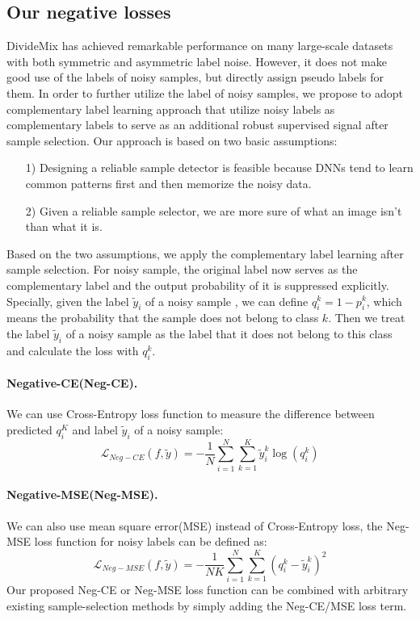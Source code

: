\documentclass[10pt,twocolumn,letterpaper]{article}
\begin{document}
\subsection{Our negative losses}
DivideMix has achieved remarkable performance on many large-scale datasets with both symmetric and asymmetric label noise. However, it does not make good use of the labels of noisy samples, but directly assign pseudo labels for them. In order to further utilize the label of noisy samples, we propose to adopt complementary label learning\cite{ishida2017learning} approach that utilize noisy labels as complementary labels to serve as an additional robust supervised signal after sample selection. Our approach is based on two basic assumptions:
\begin{itemize}
\item[1)] Designing a reliable sample detector is feasible because DNNs tend to learn common patterns first and then memorize the noisy data\cite{arpit2017closer}.
\item[2)] Given a reliable sample selector, we are more sure of what an image isn't than what it is.
\end{itemize}
Based on the two assumptions, we apply the complementary label learning after sample selection. For noisy sample, the original label now serves as the complementary label and the output probability of it is suppressed explicitly. Specially, given the label $ \tilde{y}_{i} $ of a noisy sample , we can define $ q_{i}^{k} = 1 - p_{i}^{k} $, which means the probability that the sample does not belong to class $ k $. Then we treat the label $ \tilde{y}_{i} $ of a noisy sample as the label that it does not belong to this class and calculate the loss with $q_{i}^{k}$.
\paragraph{Negative-CE(Neg-CE).} We can use Cross-Entropy loss function to measure the difference between predicted $ q_{i}^{K}$ and label $ \tilde{y}_{i} $ of a noisy sample:
\begin{equation}\label{negce}
\mathcal{L}_{Neg-CE}(f,\tilde{y})=-\frac{1}{N} \sum_{i=1}^{N} \sum_{k=1}^{K} \tilde{y}_{i}^{k} \log \left(q_{i}^{k}\right)
\end{equation}
\paragraph{Negative-MSE(Neg-MSE).} We can also use mean square error(MSE) instead of Cross-Entropy loss, the Neg-MSE loss function for noisy labels can be defined as:
\begin{equation}\label{negmse}
\mathcal{L}_{Neg-MSE}(f,\tilde{y})=-\frac{1}{NK} \sum_{i=1}^{N} \sum_{k=1}^{K} (q_{i}^{k}-\tilde{y}_{i}^{k})^{2}
\end{equation}
Our proposed Neg-CE or Neg-MSE loss function can be combined with arbitrary existing sample-selection methods by simply adding the Neg-CE/MSE loss term. 
\end{document}
